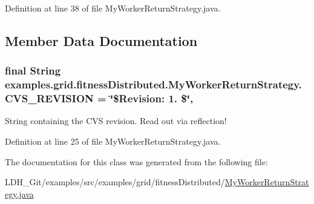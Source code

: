 Definition at line 38 of file My\-Worker\-Return\-Strategy.\-java.



\subsection{Member Data Documentation}
\hypertarget{classexamples_1_1grid_1_1fitness_distributed_1_1_my_worker_return_strategy_a5e853039ad1a2a3b1ade50b264f4067b}{
\subsubsection[{C\-V\-S\-\_\-\-R\-E\-V\-I\-S\-I\-O\-N}]{\setlength{\rightskip}{0pt plus 5cm}final String examples.\-grid.\-fitness\-Distributed.\-My\-Worker\-Return\-Strategy.\-C\-V\-S\-\_\-\-R\-E\-V\-I\-S\-I\-O\-N = \char`\"{}\$Revision\-: 1. \$\char`\"{}\hspace{0.3cm}{\ttfamily [static]}, {\ttfamily [private]}}}\label{classexamples_1_1grid_1_1fitness_distributed_1_1_my_worker_return_strategy_a5e853039ad1a2a3b1ade50b264f4067b}
String containing the C\-V\-S revision. Read out via reflection! 

Definition at line 25 of file My\-Worker\-Return\-Strategy.\-java.



The documentation for this class was generated from the following file\-:\begin{DoxyCompactItemize}
\item 
L\-D\-H\-\_\-\-Git/examples/src/examples/grid/fitness\-Distributed/\hyperlink{fitness_distributed_2_my_worker_return_strategy_8java}{My\-Worker\-Return\-Strategy.\-java}\end{DoxyCompactItemize}
